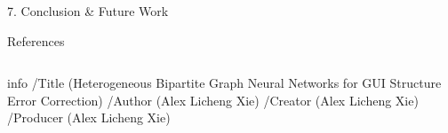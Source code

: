 \documentclass[final]{beamer}
\newlength{\sepwidth}
\newlength{\colwidth}
\newcommand{\separatorcolumn}{\begin{column}{\sepwidth}\end{column}}
\begin{document}
\begin{frame}[t]
\begin{columns}[t]
\begin{column}{\colwidth}
\begin{block}{7. Conclusion \& Future Work}
  \end{block}

  \begin{block}{References}

    \nocite{*}
    \footnotesize{}

  \end{block}

\end{column}
\separatorcolumn



\end{columns}

\end{frame}

\pdfextension info {
  /Title (Heterogeneous Bipartite Graph Neural Networks for GUI Structure Error Correction)
  /Author (Alex Licheng Xie)
  /Creator (Alex Licheng Xie)
  /Producer (Alex Licheng Xie)
}
\end{document}
